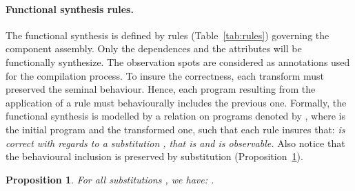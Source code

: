 \documentclass{eptcs}
\newtheorem{proposition}{Proposition}
\newcommand{\ie}[0]{\abbrev{\textit{i.e.}}}
\newcounter{ti}
\begin{document}
\paragraph{Functional synthesis rules.} The functional synthesis is defined by rules (Table~\ref{tab:rules}) governing the component assembly. Only the dependences and the attributes will be functionally synthesize. 
The observation spots are considered as annotations used for the compilation process. 
To insure the correctness, each transform must preserved the seminal behaviour. Hence, 
each program resulting from the application of a rule must behaviourally includes the previous one. 
Formally, the functional synthesis is modelled by a relation on programs denoted by , \ie  where  is the initial program and  the transformed one, such that each rule insures that:
\emph{ is correct with regards to a substitution , that is 
 and  is observable.}
Also notice that the behavioural inclusion is preserved by substitution (Proposition~\ref{prop:subst-behinc}). 

 \begin{proposition} For all substitutions , we have: . 
\label{prop:subst-behinc}
\end{proposition}
\end{document}
